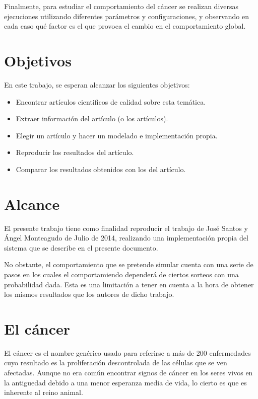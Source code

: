 Finalmente, para estudiar el comportamiento del cáncer se realizan diversas ejecuciones utilizando diferentes parámetros y configuraciones,
y observando en cada caso qué factor es el que provoca el cambio en el comportamiento global.

\section{Objetivos}

En este trabajo, se esperan alcanzar los siguientes objetivos:

\begin{itemize}
  \item Encontrar artículos cientificos de calidad sobre esta temática.
  \item Extraer información del artículo (o los artículos).
  \item Elegir un artículo y hacer un modelado e implementación propia.
  \item Reproducir los resultados del artículo.
  \item Comparar los resultados obtenidos con los del artículo.
\end{itemize}

\section{Alcance}

El presente trabajo tiene como finalidad reproducir el trabajo de José Santos y Ángel Monteagudo de Julio de 2014, realizando
una implementación propia del sistema que se describe en el presente documento.

No obstante, el comportamiento que se pretende simular cuenta con una serie de pasos en los cuales el comportamiendo dependerá
de ciertos sorteos con una probabilidad dada. Esta es una limitación a tener en cuenta a la hora de obtener los mismos resultados
que los autores de dicho trabajo.

\section{El cáncer}

El cáncer es el nombre genérico usado para referirse a más de 200 enfermedades cuyo resultado
es la proliferación descontrolada de las células que se ven afectadas. Aunque no era común
encontrar signos de cáncer en los seres vivos en la antiguedad debido a una menor esperanza
media de vida, lo cierto es que es inherente al reino animal.


